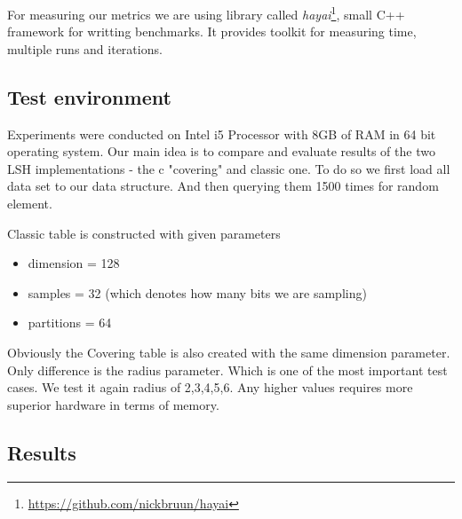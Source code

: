 For measuring our metrics we are using library called \textit{hayai}\footnote{\url{https://github.com/nickbruun/hayai}}, small C++ framework for writting benchmarks. It provides toolkit for measuring time, multiple runs and iterations.

\subsection{Test environment}

Experiments were conducted on Intel i5 Processor with 8GB of RAM in 64 bit operating system. Our main idea is to compare and evaluate results of the two LSH implementations - the c "covering" and classic one. To do so we first load all data set to our data structure. And then querying them 1500 times for random element.

Classic table is constructed with given parameters

\begin{itemize}
  \item dimension = 128
  \item samples = 32 (which denotes how many bits we are sampling)
  \item partitions = 64
\end{itemize}

Obviously the Covering table is also created with the same dimension parameter. Only difference is the radius parameter. Which is one of the most important test cases. We test it again radius of 2,3,4,5,6. Any higher values requires more superior hardware in terms of memory.

\subsection{Results}

\begin{figure}[ht]
\end{figure}

